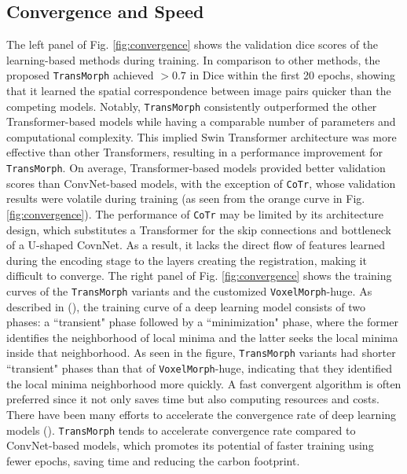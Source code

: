 \documentclass[times,twocolumn,final]{elsarticle}
\begin{document}
\subsection{Convergence and Speed}
The left panel of Fig. \ref{fig:convergence} shows the validation dice scores of the learning-based methods during training. In comparison to other methods, the proposed \texttt{TransMorph} achieved $>0.7$ in Dice within the first 20 epochs, showing that it learned the spatial correspondence between image pairs quicker than the competing models. Notably, \texttt{TransMorph} consistently outperformed the other Transformer-based models while having a comparable number of parameters and computational complexity. This implied Swin Transformer architecture was more effective than other Transformers, resulting in a performance improvement for \texttt{TransMorph}. On average, Transformer-based models provided better validation scores than ConvNet-based models, with the exception of \texttt{CoTr}, whose validation results were volatile during training (as seen from the orange curve in Fig. \ref{fig:convergence}). The performance of \texttt{CoTr} may be limited by its architecture design, which substitutes a Transformer for the skip connections and bottleneck of a U-shaped CovnNet. As a result, it lacks the direct flow of features learned during the encoding stage to the layers creating the registration, making it difficult to converge. The right panel of Fig. \ref{fig:convergence} shows the training curves of the \texttt{TransMorph} variants and the customized \texttt{VoxelMorph}-huge. As described in (\cite{im2016empirical, sutskever2013importance, darken1991towards}), the training curve of a deep learning model consists of two phases: a ``transient" phase followed by a ``minimization" phase, where the former identifies the neighborhood of local minima and the latter seeks the local minima inside that neighborhood. As seen in the figure, \texttt{TransMorph} variants had shorter ``transient" phases than that of \texttt{VoxelMorph}-huge, indicating that they identified the local minima neighborhood more quickly. A fast convergent algorithm is often preferred since it not only saves time but also computing resources and costs. There have been many efforts to accelerate the convergence rate of deep learning models (\cite{darken1991towards, looney1996stabilization, zeiler2013rectified, smith2019super}). \texttt{TransMorph} tends to accelerate convergence rate compared to ConvNet-based models, which promotes its potential of faster training using fewer epochs, saving time and reducing the carbon footprint.
\end{document}
